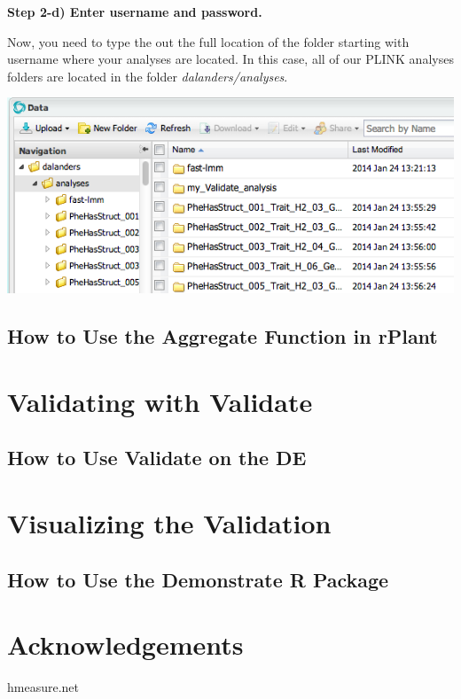 \documentclass[twoside,a4paper]{refart}
\begin{document}
\textbf{Step 2-d) Enter username and password.}

Now, you need to type the out the full location of the folder starting with username where your analyses are located. In this case, all of our PLINK analyses folders are located in the folder \textit{dalanders/analyses}.



\includegraphics[width=\textwidth]{doc_step2_2}



\subsection{How to Use the Aggregate Function in rPlant}

\section{Validating with Validate}

\subsection{How to Use Validate on the DE}

\section{Visualizing the Validation}

\subsection{How to Use the Demonstrate R Package}

\section{Acknowledgements}
hmeasure.net
\end{document}
